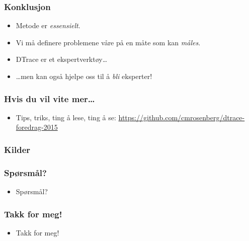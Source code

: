 \documentclass{beamer}
\begin{document}
 \begin{frame}
     \frametitle{Konklusjon}
     \begin{itemize}
         \item Metode er \emph{essensielt}.
         \item Vi må definere problemene våre på en måte som kan \emph{måles}.
         \item DTrace er et ekspertverktøy…
         \item …men kan også hjelpe oss til å \emph{bli} eksperter!
     \end{itemize}
 \end{frame}

 \begin{frame}
     \frametitle{Hvis du vil vite mer…}
     \begin{itemize}
         \item Tips, triks, ting å lese, ting å se: \url{https://github.com/cmrosenberg/dtrace-foredrag-2015}
     \end{itemize}
 \end{frame}

 \begin{frame}
     \frametitle{Kilder}
     \printbibliography{}
 \end{frame}



 \begin{frame}
     \frametitle{Spørsmål?}
     \begin{itemize}
         \item Spørsmål?
     \end{itemize}
 \end{frame}

 \begin{frame}
     \frametitle{Takk for meg!}
     \begin{itemize}
         \item Takk for meg!
     \end{itemize}
 \end{frame}
\end{document}
